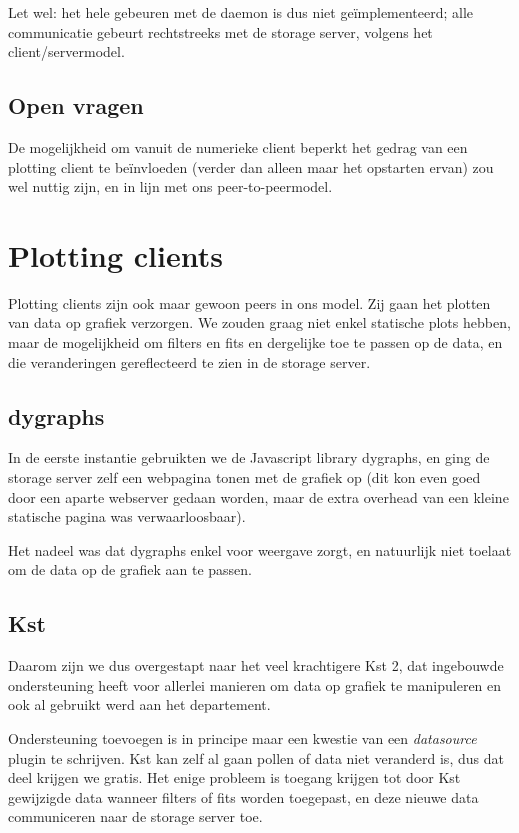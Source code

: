 \documentclass[a4paper]{article}
\begin{document}
Let wel: het hele gebeuren met de daemon is dus niet ge\"implementeerd; alle
communicatie gebeurt rechtstreeks met de storage server, volgens het
client/servermodel.

\subsection{Open vragen}

De mogelijkheid om vanuit de numerieke client beperkt het gedrag van een
plotting client te be\"invloeden (verder dan alleen maar het opstarten ervan)
zou wel nuttig zijn, en in lijn met ons peer-to-peermodel.

\newpage

\section{Plotting clients}
\label{sec:plotter}

Plotting clients zijn ook maar gewoon peers in ons model. Zij gaan het plotten
van data op grafiek verzorgen. We zouden graag niet enkel statische plots
hebben, maar de mogelijkheid om filters en fits en dergelijke toe te passen op
de data, en die veranderingen gereflecteerd te zien in de storage server.

\subsection{dygraphs}
\label{sec:dygraphs}

In de eerste instantie gebruikten we de Javascript library dygraphs, en ging
de storage server zelf een webpagina tonen met de grafiek op (dit kon even
goed door een aparte webserver gedaan worden, maar de extra overhead van een
kleine statische pagina was verwaarloosbaar).

Het nadeel was dat dygraphs enkel voor weergave zorgt, en natuurlijk niet
toelaat om de data op de grafiek aan te passen.

\subsection{Kst}

Daarom zijn we dus overgestapt naar het veel krachtigere Kst 2, dat ingebouwde
ondersteuning heeft voor allerlei manieren om data op grafiek te manipuleren
en ook al gebruikt werd aan het departement.

Ondersteuning toevoegen is in principe maar een kwestie van een
{\it datasource} plugin te schrijven. Kst kan zelf al gaan pollen of data niet
veranderd is, dus dat deel krijgen we gratis. Het enige probleem is toegang
krijgen tot door Kst gewijzigde data wanneer filters of fits worden toegepast,
en deze nieuwe data communiceren naar de storage server toe.
\end{document}
